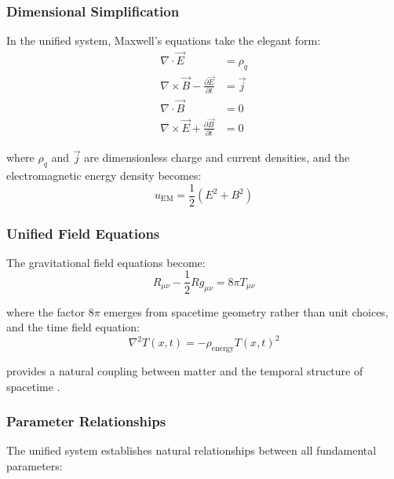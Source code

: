 \documentclass[12pt,a4paper]{article}
\newcommand{\Tfieldt}{T(x,t)}
\begin{document}
	\subsubsection{Dimensional Simplification}
	\label{subsubsec:dimensional_simplification}
	
	In the unified system, Maxwell's equations take the elegant form:
	\begin{align}
		\nabla \cdot \vec{E} &= \rho_q \\
		\nabla \times \vec{B} - \frac{\partial \vec{E}}{\partial t} &= \vec{j} \\
		\nabla \cdot \vec{B} &= 0 \\
		\nabla \times \vec{E} + \frac{\partial \vec{B}}{\partial t} &= 0
	\end{align}
	
	where $\rho_q$ and $\vec{j}$ are dimensionless charge and current densities, and the electromagnetic energy density becomes:
	\begin{equation}
		u_{\text{EM}} = \frac{1}{2}(E^2 + B^2)
	\end{equation}
	
	\subsubsection{Unified Field Equations}
	\label{subsubsec:unified_field_equations}
	
	The gravitational field equations become:
	\begin{equation}
		R_{\mu\nu} - \frac{1}{2}Rg_{\mu\nu} = 8\pi T_{\mu\nu}
	\end{equation}
	
	where the factor $8\pi$ emerges from spacetime geometry rather than unit choices, and the time field equation:
	\begin{equation}
		\nabla^2 \Tfieldt = -\rho_{\text{energy}} \Tfieldt^2
	\end{equation}
	
	provides a natural coupling between matter and the temporal structure of spacetime \cite{pascher_lagrangian_2025}.
	
	\subsubsection{Parameter Relationships}
	\label{subsubsec:parameter_relationships}
	
	The unified system establishes natural relationships between all fundamental parameters:
	
\end{document}
